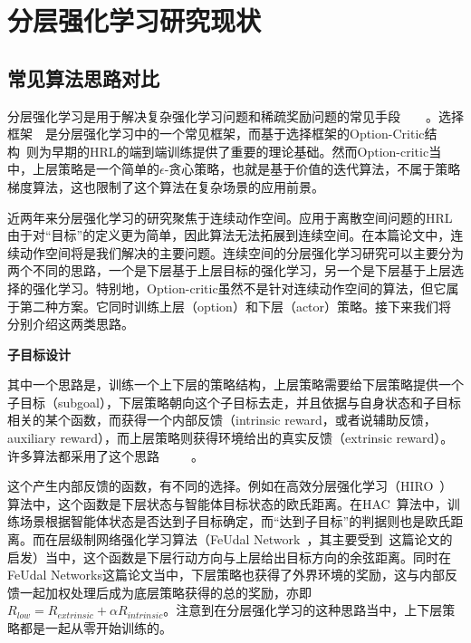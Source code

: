 \section{分层强化学习研究现状}
\subsection{常见算法思路对比}
分层强化学习是用于解决复杂强化学习问题和稀疏奖励问题的常见手段~\cite{Sutton:1999}~\cite{HRL_with_maxQ}~\cite{FUN}~\cite{Barto_HRL}。选择框架~\cite{Sutton:1998_options}~\cite{Sutton:1999}是分层强化学习中的一个常见框架，而基于选择框架的Option-Critic结构~\cite{option-critic}则为早期的HRL的端到端训练提供了重要的理论基础。然而Option-critic当中，上层策略是一个简单的$\epsilon$-贪心策略，也就是基于价值的迭代算法，不属于策略梯度算法，这也限制了这个算法在复杂场景的应用前景。

近两年来分层强化学习的研究聚焦于连续动作空间。应用于离散空间问题的HRL由于对``目标''的定义更为简单，因此算法无法拓展到连续空间。在本篇论文中，连续动作空间将是我们解决的主要问题。连续空间的分层强化学习研究可以主要分为两个不同的思路，一个是下层基于上层目标的强化学习，另一个是下层基于上层选择的强化学习。特别地，Option-critic虽然不是针对连续动作空间的算法，但它属于第二种方案。它同时训练上层（option）和下层（actor）策略。接下来我们将分别介绍这两类思路。

\textbf{子目标设计}

其中一个思路是，训练一个上下层的策略结构，上层策略需要给下层策略提供一个子目标（subgoal），下层策略朝向这个子目标去走，并且依据与自身状态和子目标相关的某个函数，而获得一个内部反馈（intrinsic reward，或者说辅助反馈，auxiliary reward），而上层策略则获得环境给出的真实反馈（extrinsic reward）。许多算法都采用了这个思路~\cite{Sutton:1999}~\cite{Tenenbaum2016NIPS}~\cite{HIRO}~\cite{HAC}~\cite{feudal}。

这个产生内部反馈的函数，有不同的选择。例如在高效分层强化学习（HIRO~\cite{HIRO}）算法中，这个函数是下层状态与智能体目标状态的欧氏距离。在HAC~\cite{HAC}算法中，训练场景根据智能体状态是否达到子目标确定，而``达到子目标''的判据则也是欧氏距离。而在层级制网络强化学习算法（FeUdal Network~\cite{feudal}，其主要受到~\cite{FUN}这篇论文的启发）当中，这个函数是下层行动方向与上层给出目标方向的余弦距离。同时在FeUdal Networks这篇论文当中，下层策略也获得了外界环境的奖励，这与内部反馈一起加权处理后成为底层策略获得的总的奖励，亦即$R_{low} = R_{extrinsic} + \alpha R_{intrinsic}$。注意到在分层强化学习的这种思路当中，上下层策略都是一起从零开始训练的。

